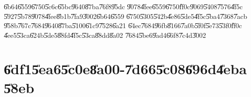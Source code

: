 \documentclass[12pt,a4paper]{article}
\begin{document}
\U{6b64}\U{6559}\U{6750}\U{5c6c}\U{65bc}\U{9640}\U{87ba}\U{76f8}\U{95dc}%
\U{9078}\U{4fee}\U{6559}\U{6750}\U{ff0c}\U{9069}\U{5408}\U{7576}\U{4f5c}%
\U{5927}\U{5b78}\U{9078}\U{4fee}\U{8b1b}\U{7fa9}\U{3002}\U{6b64}\U{6559}%
\U{6750}\U{5305}\U{542b}\U{4e86}\U{5de5}\U{4f5c}\U{5ba4}\U{7368}\U{7acb}%
\U{958b}\U{767c}\U{7684}\U{9640}\U{87ba}\U{5100}\U{61c9}\U{7528}\U{6a21}%
\U{64ec}\U{7684}\U{96fb}\U{8166}\U{7a0b}\U{5f0f}\U{5e73}\U{53f0}\U{ff0c}%
\U{4ee5}\U{53ca}\U{624b}\U{5de5}\U{88fd}\U{4f5c}\U{53ca}\U{88dd}\U{8a02}%
\U{7684}\U{5be6}\U{9ad4}\U{66f8}\U{7c4d}\U{3002}

\bigskip

\section{\U{6df1}\U{5ea6}\U{5c0e}\U{8a00}-\U{7d66}\U{5c08}\U{696d}\U{4eba}%
\U{58eb}}

\bigskip
\end{document}
